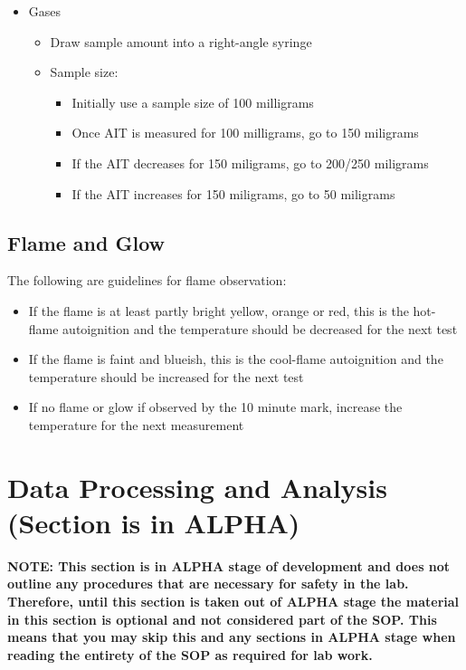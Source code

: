 \documentclass[letterpaper,11pt]{article}
\begin{document}
\begin{itemize}
    \item Gases
        \begin{itemize}
        \item Draw sample amount into a right-angle syringe
        \item Sample size:
            \begin{itemize}
            \item Initially use a sample size of 100 milligrams
            \item Once AIT is measured for 100 milligrams, go to 150 
                miligrams
            \item If the AIT decreases for 150 miligrams, go to 200/250 
                miligrams
            \item If the AIT increases for 150 miligrams, go to 50
                miligrams
            \end{itemize}
        
        \end{itemize}
    
    \end{itemize}

    
    \subsection{Flame and Glow}
    The following are guidelines for flame observation:
    \begin{itemize}
    \item If the flame is at least partly bright yellow, orange or red, this is 
        the hot-flame autoignition and the temperature should be 
        decreased for the next test
    \item If the flame is faint and blueish, this is the cool-flame 
        autoignition and the temperature should be increased for 
        the next test
    \item If no flame or glow if observed by the 10 minute mark, 
        increase the temperature for the next measurement
    \end{itemize}


\section{Data Processing and Analysis (Section is in ALPHA)} \label{sec:data_pa}
\textbf{NOTE: This section is in ALPHA stage of development and does not outline any 
procedures that are necessary for safety in the lab. Therefore, until this
section is taken out of ALPHA stage the material in this section is optional and
not considered part of the SOP. This means that you may skip this and any 
sections in ALPHA stage when reading the entirety of the SOP as required for lab
work.}
 
\end{document}
